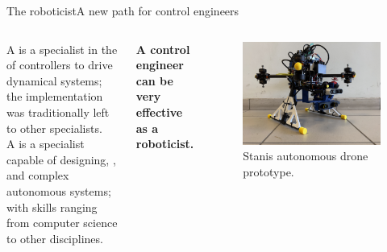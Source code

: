 \begin{frame}{The roboticist}{A new path for control engineers}
	\begin{columns}
		A  is a specialist in the  of controllers to drive dynamical systems; the implementation was traditionally left to other specialists.\\
		A  is a specialist capable of designing, , and  complex autonomous systems; with skills ranging from computer science to other disciplines.
		\begin{block}{}
			\centering
			\textbf{A control engineer can be very effective as a roboticist.}
		\end{block}

		\begin{figure}
			\centering
			\includegraphics[width=.8\textwidth]{stanis}
			\caption{Stanis autonomous drone prototype.}
			\label{fig:stanis}
		\end{figure}
	\end{columns}
\end{frame}
